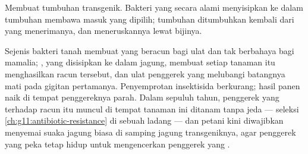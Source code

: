 \begin{omfigure}

{\small Membuat tumbuhan transgenik. Bakteri yang secara alami
menyisipkan  ke dalam  tumbuhan membawa masuk  yang dipilih;
tumbuhan ditumbuhkan kembali dari  yang menerimanya, dan
meneruskannya lewat bijinya.}
\end{omfigure}

\begin{example}\label{ex:g12:domesticated-plants:bt}
Sejenis bakteri tanah membuat  yang beracun bagi ulat dan tak
berbahaya bagi mamalia; , yang disisipkan ke dalam jagung,
membuat setiap  tanaman itu menghasilkan racun tersebut, dan ulat
penggerek yang melubangi batangnya mati pada gigitan pertamanya.
Penyemprotan insektisida berkurang; hasil panen naik di tempat
penggereknya parah. Dalam sepuluh tahun, penggerek yang  terhadap
racun itu muncul di tempat tanaman ini ditanam tanpa jeda --- seleksi
\cref{ch:g11:antibiotic-resistance} di sebuah ladang --- dan petani
kini diwajibkan menyemai suaka jagung biasa di samping jagung
transgeniknya, agar penggerek yang peka tetap hidup untuk mengencerkan
penggerek yang .
\end{example}

